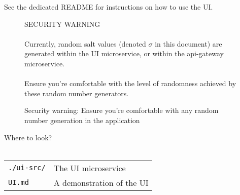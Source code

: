 See the dedicated README for instructions on how to use the UI.\\

\begin{figure}[H]
  \begin{center}
    \begin{mdframed}[backgroundcolor=verylightred]
      \noindent
      SECURITY WARNING\\
      \\
      Currently, random salt values (denoted $\sigma$ in this document) are generated within the UI microservice, or within the api-gateway microservice.\\
      \\
      Ensure you're comfortable with the level of randomness achieved by these random number generators.
    \end{mdframed}
  \end{center}
  \caption{Security warning: Ensure you're comfortable with any random number generation in the application}
\end{figure}

\begin{center}
  \begin{mdframed}[backgroundcolor=verylightblue]
    Where to look?\\
    \\
    \begin{tabular}{lp{14cm}}
      \texttt{./ui-src/} & The UI microservice\\
      \texttt{UI.md} & A demonstration of the UI\\
    \end{tabular}
  \end{mdframed}
\end{center}


